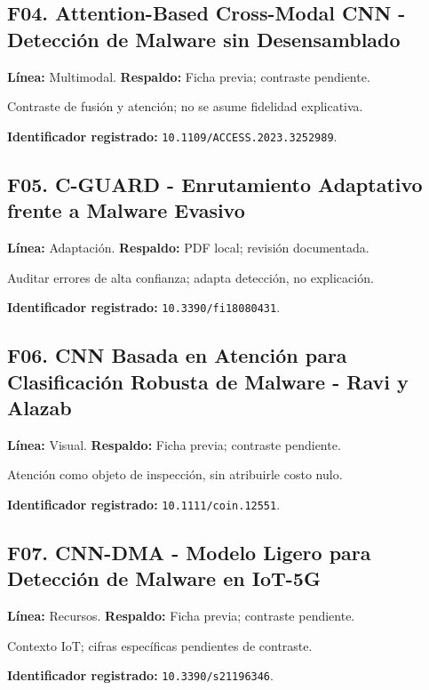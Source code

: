 \begin{samepage}
\subsection*{F04. Attention-Based Cross-Modal CNN - Detección de Malware sin Desensamblado}
\noindent\textbf{Línea:} Multimodal. \textbf{Respaldo:} Ficha previa; contraste pendiente. 

Contraste de fusión y atención; no se asume fidelidad explicativa.

\noindent\textbf{Identificador registrado:} \nolinkurl{10.1109/ACCESS.2023.3252989}.

\end{samepage}
\begin{samepage}
\subsection*{F05. C-GUARD - Enrutamiento Adaptativo frente a Malware Evasivo}
\noindent\textbf{Línea:} Adaptación. \textbf{Respaldo:} PDF local; revisión documentada. \parencite{Imran2026CGUARD}

Auditar errores de alta confianza; adapta detección, no explicación.

\noindent\textbf{Identificador registrado:} \nolinkurl{10.3390/fi18080431}.

\end{samepage}
\begin{samepage}
\subsection*{F06. CNN Basada en Atención para Clasificación Robusta de Malware - Ravi y Alazab}
\noindent\textbf{Línea:} Visual. \textbf{Respaldo:} Ficha previa; contraste pendiente. 

Atención como objeto de inspección, sin atribuirle costo nulo.

\noindent\textbf{Identificador registrado:} \nolinkurl{10.1111/coin.12551}.

\end{samepage}
\begin{samepage}
\subsection*{F07. CNN-DMA - Modelo Ligero para Detección de Malware en IoT-5G}
\noindent\textbf{Línea:} Recursos. \textbf{Respaldo:} Ficha previa; contraste pendiente. 

Contexto IoT; cifras específicas pendientes de contraste.

\noindent\textbf{Identificador registrado:} \nolinkurl{10.3390/s21196346}.

\end{samepage}
